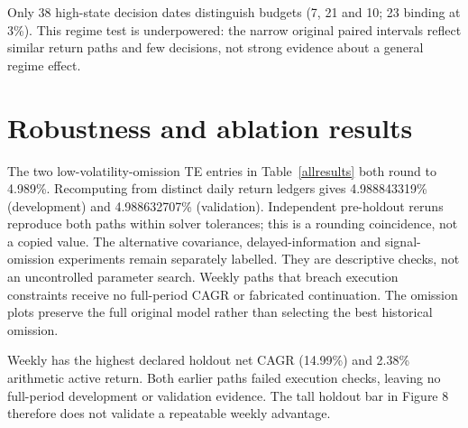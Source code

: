 \documentclass[11pt,a4paper]{article}
\begin{document}
Only 38 high-state decision dates distinguish budgets (7, 21 and 10; 23 binding at 3\%). This regime test is underpowered: the narrow original paired intervals reflect similar return paths and few decisions, not strong evidence about a general regime effect.


\section{Robustness and ablation results}
The two low-volatility-omission TE entries in Table~\ref{allresults} both round to 4.989\%. Recomputing from distinct daily return ledgers gives 4.988843319\% (development) and 4.988632707\% (validation). Independent pre-holdout reruns reproduce both paths within solver tolerances; this is a rounding coincidence, not a copied value.
The alternative covariance, delayed-information and signal-omission experiments
remain separately labelled. They are descriptive checks, not an uncontrolled
parameter search. Weekly paths that breach execution constraints receive no
full-period CAGR or fabricated continuation. The omission plots preserve the
full original model rather than selecting the best historical omission.

Weekly has the highest declared holdout net CAGR (14.99\%) and 2.38\% arithmetic active return. Both earlier paths failed execution checks, leaving no full-period development or validation evidence. The tall holdout bar in Figure 8 therefore does not validate a repeatable weekly advantage.
\end{document}
